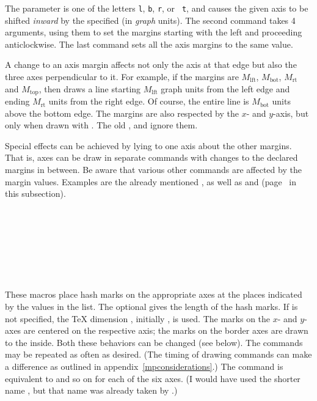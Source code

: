\documentclass[letterpaper]{article}
\begin{document}
The parameter  is one of the letters \texttt{l},
\texttt{b}, \texttt{r}, or \texttt{ t}, and  causes the
given axis to be shifted \emph{inward} by the  specified (in
\emph{graph} units). The second command  takes
4 arguments, using them to set the margins starting with the left and
proceeding anticlockwise. The last command sets all the axis margins to
the same value.

A change to an axis margin affects not only the axis at that edge but
also the three axes perpendicular to it. For example, if the margins are
$M_{\mathrm{lft}}$, $M_{\mathrm{bot}}$, $M_{\mathrm{rt}}$ and
$M_{\mathrm{top}}$, then  draws a line starting
$M_{\mathrm{lft}}$ graph units from the left edge and ending
$M_{\mathrm{rt}}$ units from the right edge. Of course, the entire line
is $M_{\mathrm{bot}}$  units above the bottom edge. The margins are also
respected by the $x$- and $y$-axis, but only when drawn with .
The old ,  and  ignore them.

Special effects can be achieved by lying to one axis about the other
margins. That is, axes can be draw in separate commands with changes to
the declared margins in between. Be aware that various other commands
are affected by the margin values. Examples are the already mentioned
, as well as  and 
(page~\pageref{grid} in this subsection).

\begin{cd}
\\
\\
\\
\\
\\
\\
%
%
%
%
%
%
%
\end{cd}

These macros place hash marks on the appropriate axes at the places
indicated by the values in the list. The optional  gives the
length of the hash marks. If  is not specified, the \TeX{}
dimension , initially \dim{4pt}, is used. The marks on the
$x$- and $y$-axes are centered on the respective axis; the marks on the
border axes are drawn to the inside.  Both these behaviors can be
changed (see below). The commands may be repeated as often as desired.
(The timing of drawing commands can make a difference as outlined in
appendix~\ref{mpconsiderations}.) The command  is
equivalent to  and so on for each of the six axes. (I would
have used the shorter name , but that name was already taken
by \eTeX{}.)
\end{document}
